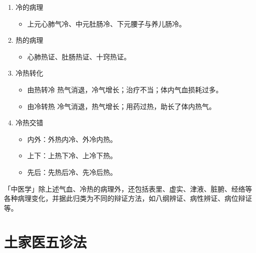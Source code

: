 \documentclass[cn,blue,12pt,normal,founder]{elegantnote}
\begin{document}
\begin{enumerate}
  \item 冷的病理
  \begin{itemize}
    \item 上元心肺气冷、中元肚肠冷、下元腰子与养儿肠冷。
  \end{itemize}

  \item 热的病理
  \begin{itemize}
    \item 心肺热证、肚肠热证、十窍热证。
  \end{itemize}

  \item 冷热转化
  \begin{itemize}
    \item 由热转冷
    \subitem 热气消退，冷气增长；治疗不当；体内气血损耗过多。
    \item 由冷转热
    \subitem 冷气消退，热气增长；用药过热，助长了体内热气。
  \end{itemize}
  \item 冷热交错
  \begin{itemize}
    \item 内外：外热内冷、外冷内热。
    \item 上下：上热下冷、上冷下热。
    \item 先后：先热后冷、先冷后热。
  \end{itemize}
\end{enumerate}

\begin{note}
  「中医学」除上述气血、冷热的病理外，还包括表里、虚实、津液、脏腑、经络等各种病理变化，并据此归类为不同的辩证方法，如八纲辨证、病性辨证、病位辩证等。
\end{note}

\section{土家医五诊法}
\end{document}
